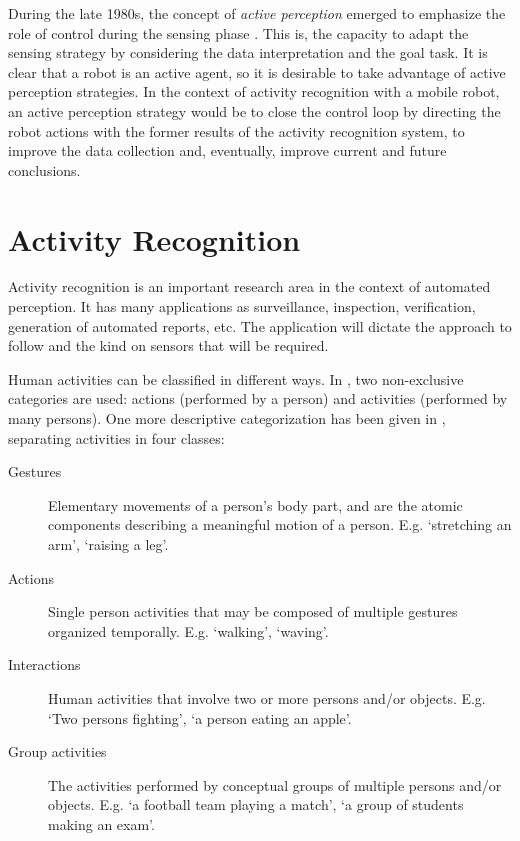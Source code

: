 During the late 1980s, the concept of \textit{active perception} emerged to emphasize the role of control during the sensing phase \citep{Bajcsy88_ActivePerception}.
This is, the capacity to adapt the sensing strategy by considering the data interpretation and the goal task.
It is clear that a robot is an active agent, so it is desirable to take advantage of active perception strategies.
In the context of activity recognition with a mobile robot, an active perception strategy would be to close the control loop by directing the robot actions with the former results of the activity recognition system, to improve the data collection and, eventually, improve current and future conclusions.




\section{Activity Recognition} 

Activity recognition is an important research area in the context of automated perception. 
It has many applications as surveillance, inspection, verification, generation of automated reports, etc.
The application will dictate the approach to follow and the kind on sensors that will be required.

Human activities can be classified in different ways.
In \citep{Turaga2008_MaRecHuAcSurv}, two non-exclusive categories are used: actions (performed by a person) and activities (performed by many persons).
One more descriptive categorization has been given in \citep{Aggarwal11_HumanActivity}, separating activities in four classes:

\begin{description}
\item[Gestures] Elementary movements of a person's body part, and are the atomic components describing a meaningful motion of a person. 
E.g. `stretching an arm', `raising a leg'.
\item[Actions] Single person activities that may be composed of multiple gestures organized temporally. 
E.g. `walking', `waving'.
\item[Interactions] Human activities that involve two or more persons and/or objects. 
E.g. `Two persons fighting', `a person eating an apple'.
\item[Group activities] The activities performed by conceptual groups of multiple persons and/or objects. 
E.g. `a football team playing a match', `a group of students making an exam'.
\end{description}


